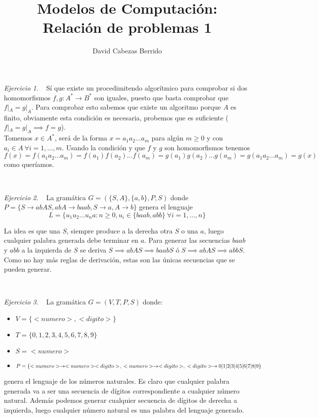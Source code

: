 \documentclass[12pt,spanish]{article}
\theoremstyle{definition}
\theoremstyle{remark}
\newtheorem{exercise}{Ejercicio}%
\begin{document}
\title{Modelos de Computación: \\ Relación de problemas 1}
\author{David Cabezas Berrido}
\date{\vspace{-5mm}}
\maketitle

\setcounter{exercise}{12}
\begin{exercise}~ Sí que existe un procedimitendo algorítmico para
  comprobar si dos homomorfismos $f,g:A^*\rightarrow B^*$ son iguales,
  puesto que basta comprobar que $f|_A = g|_A$. Para comprobar esto
  sabemos que existe un algoritmo porque $A$ es finito, obviamente
  esta condición es necesaria, probemos que es suficiente
  ($f|_A = g|_A \implies f=g$). \\

Tomemos $x \in A^*$, será de la forma $x=a_1a_2\ldots a_m$ para algún
$m\geq 0$ y con $a_i \in A \ \forall i=1,\ldots,m$.  Usando la
condición y que $f$ y $g$ son homomorfismos tenemos
\[f(x)=f(a_1a_2\ldots a_m)=f(a_1)f(a_2)\ldots
  f(a_m)=g(a_1)g(a_2)\ldots g(a_m)=g(a_1a_2\ldots a_m)=g(x)\]
como queríamos.
\end{exercise}
~
\setcounter{exercise}{15}
\begin{exercise}~ La gramática $G=(\{S,A\},\{a,b\},P,S)$ donde \\
  $P=\{S\rightarrow abAS, abA\rightarrow baab, S \rightarrow a, A
  \rightarrow b\}$ genera el lenguaje
  \[L=\{u_1u_2\ldots u_na: n\geq 0, u_i \in \{baab,abb\} \ \forall
    i=1,\ldots,n\}\]

  La idea es que una $S$, siempre produce a la derecha otra $S$ o una
  $a$, luego cualquier palabra generada debe terminar en $a$. Para
  generar las secuencias $baab$ y $abb$ a la izquierda de $S$ se
  deriva $S \implies abAS \implies baabS$ ó
  $S \implies abAS \implies abbS$. Como no hay más reglas de
  derivación, estas son las únicas secuencias que se pueden generar.
\end{exercise}
~
\begin{exercise}~ La gramática $G=(V,T,P,S)$ donde:
  \begin{itemize}
  \item $V=\{<numero>,<digito>\}$
  \item $T=\{0,1,2,3,4,5,6,7,8,9\}$
  \item $S=<numero>$
  \item $P=\{<numero> \rightarrow <numero><digito>, \\
    <numero>\rightarrow <digito>, \\ <digito> \rightarrow
    0|1|2|3|4|5|6|7|8|9\}$
  \end{itemize}

  genera el lenguaje de los números naturales. Es claro que cualquier
  palabra generada va a ser una secuencia de dígitos correspondiente a
  cualquier número natural. Además podemos generar cualquier secuencia
  de dígitos de derecha a izquierda, luego cualquier número natural es
  una palabra del lenguaje generado.
\end{exercise}
\end{document}
